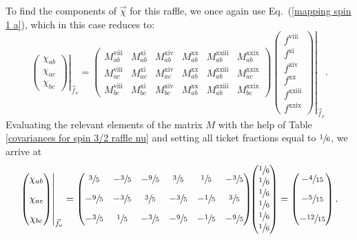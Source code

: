 To find the components of $\vec{\chi}$ for this raffle, we once again use Eq.\ (\ref{mapping spin 1 a}), which in this case reduces to:
\begin{equation}
\left. \begin{pmatrix}
\chi_{ab}\\[.3cm]
\chi_{ac}\\[.3cm]
\chi_{bc}
\end{pmatrix} \right|_{\vec{f}_\nu}
= \left. \begin{pmatrix}
M_{ab}^{\mathrm{viii}} & M_{ab}^{\mathrm{xi}} & M_{ab}^{\mathrm{xiv}} & M_{ab}^{\mathrm{xx}} & M_{ab}^{\mathrm{xxiii}} & M_{ab}^{\mathrm{xxix}} \\[.3cm]
M_{ac}^{\mathrm{viii}} & M_{ac}^{\mathrm{xi}} & M_{ac}^{\mathrm{xiv}} & M_{ab}^{\mathrm{xx}} & M_{ab}^{\mathrm{xxiii}} & M_{ac}^{\mathrm{xxix}} \\[.3cm]
M_{bc}^{\mathrm{viii}} & M_{bc}^{\mathrm{xi}} & M_{bc}^{\mathrm{xiv}} & M_{ab}^{\mathrm{xx}} & M_{ab}^{\mathrm{xxiii}} & M_{bc}^{\mathrm{xxix}}
 \end{pmatrix}
\!\! \begin{pmatrix}
f^{\mathrm{viii}} \\
f^{\mathrm{xi}} \\
f^{\mathrm{xiv}} \\
f^{\mathrm{xx}} \\
f^{\mathrm{xxiii}} \\
f^{\mathrm{xxix}}
\end{pmatrix} \right|_{\vec{f}_\nu}.
\label{mapping for raffle nu}
\end{equation}
Evaluating the relevant elements of the matrix $M$ with the help of Table \ref{covariances for spin 3/2 raffle nu} and setting all ticket fractions equal to $\sfrac16$, we arrive at
\begin{equation}
\left. \begin{pmatrix}
\chi_{ab}\\[.3cm]
\chi_{ac}\\[.3cm]
\chi_{bc}
\end{pmatrix} \right|_{\vec{f}_\nu}
= \begin{pmatrix}
\sfrac35 & -\sfrac35 & -\sfrac95 & \sfrac35 & \sfrac15 & -\sfrac35 \\[.3cm]
-\sfrac95 & -\sfrac35 & \sfrac35 & -\sfrac35 & -\sfrac15 & \sfrac35  \\[.3cm]
-\sfrac35 & \sfrac15 & -\sfrac35 & -\sfrac95 & -\sfrac15 & -\sfrac95 
 \end{pmatrix}
\!\! \begin{pmatrix}
\sfrac16 \\
\sfrac16 \\
\sfrac16 \\
\sfrac16 \\
\sfrac16 \\
\sfrac16
\end{pmatrix}
= \begin{pmatrix}
-\sfrac{4}{15} \\[.3cm]
-\sfrac{5}{15}\\[.3cm]
-\sfrac{12}{15}
\end{pmatrix}.
\label{mapping for raffle nu a}
\end{equation}
